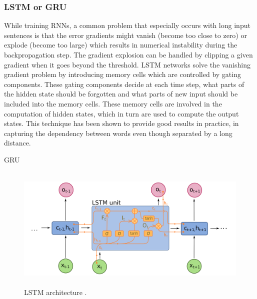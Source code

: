\documentclass[a4paper, 11pt]{article}
\begin{document}
\subsubsection{LSTM or GRU}

While training RNNs, a common problem that especially occurs with long input sentences is that the error gradients might vanish (become too close to zero) or explode (become too large) which results in numerical instability during the backpropagation step. The gradient explosion can be handled by clipping a given gradient when it goes beyond the threshold. LSTM networks \parencite{Hochreiter1997} solve the vanishing gradient problem by introducing memory cells which are controlled by gating components. These gating components decide at each time step, what parts of the hidden state should be forgotten and what parts of new input should be included into the memory cells. These memory cells are involved in the computation of hidden states, which in turn are used to compute the output states. This technique has been shown to provide good results in practice, in capturing the dependency between words even though separated by a long distance.


GRU \parencite{cho2014learning}

\begin{figure}[htpb!]
    \centering
    \includegraphics[width=\textwidth,height=6cm,keepaspectratio=true]
    {lstm-1.png}
    \caption{
        LSTM architecture \parencite{rnn-2}.
    }
    \label{fig:LSTM architecture}
\end{figure}
\end{document}
